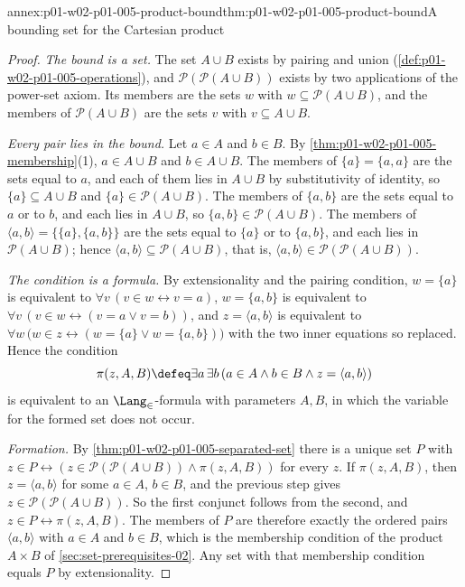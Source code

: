 \begin{annexitem}{annex:p01-w02-p01-005-product-bound}{thm:p01-w02-p01-005-product-bound}{A bounding set for the Cartesian product}
\begin{proof}
\emph{The bound is a set.} The set \(A\cup B\) exists by pairing and union
(\cref{def:p01-w02-p01-005-operations}), and
\(\mathcal P(\mathcal P(A\cup B))\) exists by two applications of the
power-set axiom. Its members are the sets \(w\) with
\(w\subseteq\mathcal P(A\cup B)\), and the members of
\(\mathcal P(A\cup B)\) are the sets \(v\) with \(v\subseteq A\cup B\).

\emph{Every pair lies in the bound.} Let \(a\in A\) and \(b\in B\). By
\cref{thm:p01-w02-p01-005-membership}(1), \(a\in A\cup B\) and
\(b\in A\cup B\). The members of \(\{a\}=\{a,a\}\) are the sets equal to
\(a\), and each of them lies in \(A\cup B\) by substitutivity of identity, so
\(\{a\}\subseteq A\cup B\) and \(\{a\}\in\mathcal P(A\cup B)\). The members of
\(\{a,b\}\) are the sets equal to \(a\) or to \(b\), and each lies in
\(A\cup B\), so \(\{a,b\}\in\mathcal P(A\cup B)\). The members of
\(\langle a,b\rangle=\{\{a\},\{a,b\}\}\) are the sets equal to \(\{a\}\) or
to \(\{a,b\}\), and each lies in \(\mathcal P(A\cup B)\); hence
\(\langle a,b\rangle\subseteq\mathcal P(A\cup B)\), that is,
\(\langle a,b\rangle\in\mathcal P(\mathcal P(A\cup B))\).

\emph{The condition is a formula.} By extensionality and the pairing
condition, \(w=\{a\}\) is equivalent to
\(\forall v\,(v\in w\leftrightarrow v=a)\), \(w=\{a,b\}\) is equivalent to
\(\forall v\,(v\in w\leftrightarrow(v=a\lor v=b))\), and
\(z=\langle a,b\rangle\) is equivalent to
\(\forall w\,\bigl(w\in z\leftrightarrow(w=\{a\}\lor w=\{a,b\})\bigr)\) with
the two inner equations so replaced. Hence the condition
\[
  \pi(z,A,B)\defeq
  \exists a\,\exists b\,(a\in A\land b\in B\land z=\langle a,b\rangle)
\]
is equivalent to an \(\Lang_{\in}\)-formula with parameters \(A,B\), in which
the variable for the formed set does not occur.

\emph{Formation.} By \cref{thm:p01-w02-p01-005-separated-set} there is a unique
set \(P\) with
\(z\in P\leftrightarrow(z\in\mathcal P(\mathcal P(A\cup B))\land\pi(z,A,B))\)
for every \(z\). If \(\pi(z,A,B)\), then \(z=\langle a,b\rangle\) for some
\(a\in A\), \(b\in B\), and the previous step gives
\(z\in\mathcal P(\mathcal P(A\cup B))\). So the first conjunct follows from
the second, and \(z\in P\leftrightarrow\pi(z,A,B)\). The members of \(P\) are
therefore exactly the ordered pairs \(\langle a,b\rangle\) with \(a\in A\) and
\(b\in B\), which is the membership condition of the product
\(A\times B\) of \cref{sec:set-prerequisites-02}. Any set with that membership
condition equals \(P\) by extensionality.
\end{proof}
\end{annexitem}

